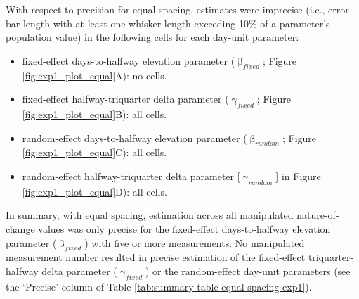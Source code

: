 \documentclass[
12pt, %
twoside,
english]{guelphthesis}
\begin{document}
With respect to precision for equal spacing, estimates were imprecise (i.e., error bar length with at least one whisker length exceeding 10\% of a parameter's population value) in the following cells for each day-unit parameter:
\begin{itemize}
\tightlist
\item
  fixed-effect days-to-halfway elevation parameter (\(\upbeta_{fixed}\); Figure \ref{fig:exp1_plot_equal}A): no cells.
\item
  fixed-effect halfway-triquarter delta parameter (\(\upgamma_{fixed}\); Figure \ref{fig:exp1_plot_equal}B): all cells.
\item
  random-effect days-to-halfway elevation parameter (\(\upbeta_{random}\); Figure \ref{fig:exp1_plot_equal}C): all cells.
\item
  random-effect halfway-triquarter delta parameter {[}\(\upgamma_{random}\){]} in Figure \ref{fig:exp1_plot_equal}D): all cells.
\end{itemize}
In summary, with equal spacing, estimation across all manipulated nature-of-change values was only precise for the fixed-effect days-to-halfway elevation parameter (\(\upbeta_{fixed}\)) with five or more measurements. No manipulated measurement number resulted in precise estimation of the fixed-effect triquarter-halfway delta parameter (\(\upgamma_{fixed}\)) or the random-effect day-unit parameters (see the `Precise' column of Table \ref{tab:summary-table-equal-spacing-exp1}).
\end{document}
